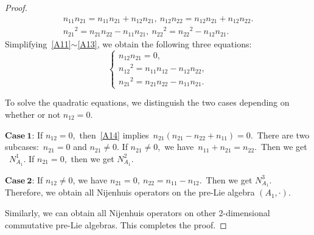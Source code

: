 \documentclass[10pt,a4paper]{amsart}
\begin{document}
\begin{proof}
\begin{eqnarray}
  n_{11}n_{21}=n_{11}n_{21}+n_{12}n_{21},~n_{12}n_{22}=n_{12}n_{21}+n_{12}n_{22}\label{A12}. \\
  {n_{21}}^2 = n_{21}n_{22}-n_{11}n_{21},~{n_{22}}^2={n_{22}}^2-n_{12}n_{21}\label{A13}.
\end{eqnarray}
Simplifying~\eqref{A11}$\sim$\eqref{A13}, we obtain the following three equations:
\begin{equation}\label{A14}
\left\{\begin{array}{l}
n_{12}n_{21}=0,\\{n_{12}}^2=n_{11}n_{12}-n_{12}n_{22},\\
{n_{21}}^2=n_{21}n_{22}-n_{11}n_{21}.
\end{array}\right.
\end{equation}

To solve the quadratic equations, we distinguish the two cases depending on whether
or not $n_{12} = 0$.

$\mathbf{Case~1}$: If $n_{12}=0$,~then~\eqref{A14} implies~$n_{21}(n_{21}-n_{22}+n_{11})=0$.~There are two subcases:~$n_{21}=0$ and $n_{21}\neq0$. If $n_{21}\neq0$,~we have~$n_{11}+n_{21}=n_{22}$.~Then we get ~$N_{A_{1}}^1$.
If $n_{21}=0$,~then we get $N_{A_{1}}^2$.

$\mathbf{Case~2}$: If $n_{12}\neq0$, we have $n_{21}=0,~n_{22}=n_{11}-n_{12}$.~Then we get $N_{A_{1}}^3$.
Therefore, we obtain all Nijenhuis operators on the pre-Lie algebra $(A_1,\cdot)$.

Similarly, we can obtain all Nijenhuis operators on other 2-dimensional  commutative pre-Lie algebras. This completes the proof.
\end{proof}
\end{document}
